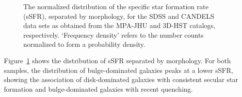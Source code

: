 \documentclass[twocolumn]{aastex63}
\begin{document}
\begin{figure}[htb]
	\begin{center}
  \end{center}
  \caption{The normalized distribution of the specific star formation rate\,(sSFR), separated by morphology, for the SDSS and CANDELS data sets as obtained from the MPA-JHU and 3D-HST catalogs, respectively. `Frequency density' refers to the number counts normalized to form a probability density.}
  \label{fig:ssfr_distr}
\end{figure}

Figure~\ref{fig:ssfr_distr} shows the distribution of sSFR separated by morphology. For both samples, the distribution of bulge-dominated galaxies peaks at a lower sSFR, showing the association of disk-dominated galaxies with consistent secular star formation and bulge-dominated galaxies with recent quenching. 
\end{document}

